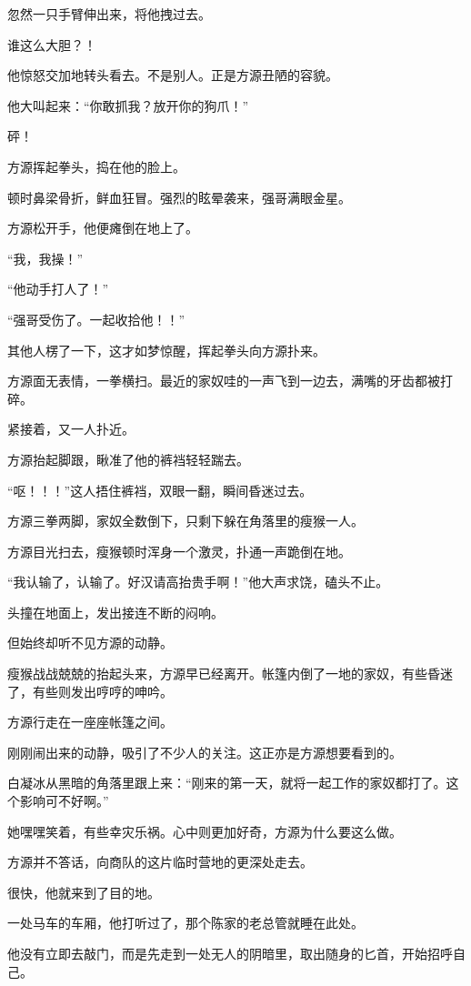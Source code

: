 \begin{this_body}
忽然一只手臂伸出来，将他拽过去。

谁这么大胆？！

他惊怒交加地转头看去。不是别人。正是方源丑陋的容貌。

他大叫起来：“你敢抓我？放开你的狗爪！”

砰！

方源挥起拳头，捣在他的脸上。

顿时鼻梁骨折，鲜血狂冒。强烈的眩晕袭来，强哥满眼金星。

方源松开手，他便瘫倒在地上了。

“我，我操！”

“他动手打人了！”

“强哥受伤了。一起收拾他！！”

其他人楞了一下，这才如梦惊醒，挥起拳头向方源扑来。

方源面无表情，一拳横扫。最近的家奴哇的一声飞到一边去，满嘴的牙齿都被打碎。

紧接着，又一人扑近。

方源抬起脚跟，瞅准了他的裤裆轻轻踹去。

“呕！！！”这人捂住裤裆，双眼一翻，瞬间昏迷过去。

方源三拳两脚，家奴全数倒下，只剩下躲在角落里的瘦猴一人。

方源目光扫去，瘦猴顿时浑身一个激灵，扑通一声跪倒在地。

“我认输了，认输了。好汉请高抬贵手啊！”他大声求饶，磕头不止。

头撞在地面上，发出接连不断的闷响。

但始终却听不见方源的动静。

瘦猴战战兢兢的抬起头来，方源早已经离开。帐篷内倒了一地的家奴，有些昏迷了，有些则发出哼哼的呻吟。

方源行走在一座座帐篷之间。

刚刚闹出来的动静，吸引了不少人的关注。这正亦是方源想要看到的。

白凝冰从黑暗的角落里跟上来：“刚来的第一天，就将一起工作的家奴都打了。这个影响可不好啊。”

她嘿嘿笑着，有些幸灾乐祸。心中则更加好奇，方源为什么要这么做。

方源并不答话，向商队的这片临时营地的更深处走去。

很快，他就来到了目的地。

一处马车的车厢，他打听过了，那个陈家的老总管就睡在此处。

他没有立即去敲门，而是先走到一处无人的阴暗里，取出随身的匕首，开始招呼自己。


\end{this_body}
